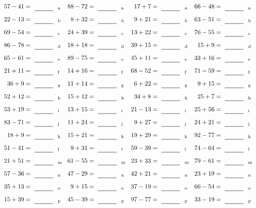 \documentclass
[
  draft    = true,
  fontsize = 11pt,
  parskip  = half-
]
{scrartcl}
\begin{document}
\clearpage
\begin{align*}
    \pline{57-41}&=\rline{a}
  & \pline{88-72}&=\rline{a}
  & \pline{17+7}&=\rline{a}
  & \pline{66-48}&=\rline{a} \\[1ex]
    \pline{22-13}&=\rline{b}
  & \pline{8+32}&=\rline{b}
  & \pline{9+21}&=\rline{b}
  & \pline{63-51}&=\rline{b} \\[1ex]
    \pline{69-54}&=\rline{c}
  & \pline{24+39}&=\rline{c}
  & \pline{13+22}&=\rline{c}
  & \pline{76-55}&=\rline{c} \\[1ex]
    \pline{86-78}&=\rline{d}
  & \pline{18+18}&=\rline{d}
  & \pline{39+15}&=\rline{d}
  & \pline{15+9}&=\rline{d} \\[1ex]
    \pline{65-61}&=\rline{e}
  & \pline{89-75}&=\rline{e}
  & \pline{45+11}&=\rline{e}
  & \pline{33+16}&=\rline{e} \\[1ex]
    \pline{21+11}&=\rline{f}
  & \pline{14+16}&=\rline{f}
  & \pline{68-52}&=\rline{f}
  & \pline{71-59}&=\rline{f} \\[1ex]
    \pline{36+9}&=\rline{g}
  & \pline{11+14}&=\rline{g}
  & \pline{6+22}&=\rline{g}
  & \pline{9+15}&=\rline{g} \\[1ex]
    \pline{52+12}&=\rline{h}
  & \pline{15+12}&=\rline{h}
  & \pline{34+8}&=\rline{h}
  & \pline{25+7}&=\rline{h} \\[1ex]
    \pline{53+19}&=\rline{i}
  & \pline{13+15}&=\rline{i}
  & \pline{21-13}&=\rline{i}
  & \pline{25+56}&=\rline{i} \\[1ex]
    \pline{83-71}&=\rline{j}
  & \pline{11+24}&=\rline{j}
  & \pline{9+27}&=\rline{j}
  & \pline{24+21}&=\rline{j} \\[1ex]
    \pline{18+9}&=\rline{k}
  & \pline{15+21}&=\rline{k}
  & \pline{19+29}&=\rline{k}
  & \pline{92-77}&=\rline{k} \\[1ex]
    \pline{51-41}&=\rline{l}
  & \pline{9+31}&=\rline{l}
  & \pline{59-39}&=\rline{l}
  & \pline{74-64}&=\rline{l} \\[1ex]
    \pline{21+51}&=\rline{m}
  & \pline{61-55}&=\rline{m}
  & \pline{23+33}&=\rline{m}
  & \pline{79-61}&=\rline{m} \\[1ex]
    \pline{57-36}&=\rline{n}
  & \pline{47-29}&=\rline{n}
  & \pline{42+21}&=\rline{n}
  & \pline{23+19}&=\rline{n} \\[1ex]
    \pline{35+13}&=\rline{o}
  & \pline{9+15}&=\rline{o}
  & \pline{37-19}&=\rline{o}
  & \pline{66-54}&=\rline{o} \\[1ex]
    \pline{15+39}&=\rline{p}
  & \pline{45-39}&=\rline{p}
  & \pline{97-77}&=\rline{p}
  & \pline{33-19}&=\rline{p}
\end{align*}
\end{document}
